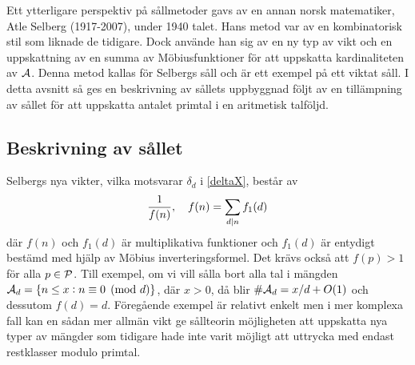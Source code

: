 Ett ytterligare perspektiv på sållmetoder gavs av en annan norsk matematiker, Atle Selberg (1917-2007), under 1940 talet. 
Hans metod var av en kombinatorisk stil som liknade de tidigare.
Dock använde han sig av en ny typ av vikt och en uppskattning av en summa av Möbiusfunktioner för att uppskatta kardinaliteten av \(\A\).
Denna metod kallas för Selbergs såll och är ett exempel på ett viktat såll. I detta avsnitt så ges en beskrivning av sållets uppbyggnad följt av en tillämpning av sållet för att uppskatta antalet primtal i en aritmetisk talföljd.

\subsection{Beskrivning av sållet}
Selbergs nya vikter, vilka motsvarar \(\delta_d\) i \eqref{deltaX}, består av
\begin{equation}
    \frac{1}{f(n)},\quad f(n) = \sum_{d\divides n}f_1(d)\nonumber
\end{equation}
där \(f(n)\) och \(f_1(d)\) är multiplikativa funktioner och \(f_1(d)\) är entydigt bestämd med hjälp av Möbius inverteringsformel. Det krävs också att \(f(p) > 1\) för alla \(p\in\P\).
Till exempel, om vi vill sålla bort alla tal i mängden \(\A_d = \{n\leq x:n \equiv 0 \pmod{d}\}\), där \(x>0\), då blir \(\#\A_d = x/d + O(1)\) och dessutom \(f(d) = d\).
Föregående exempel är relativt enkelt men i mer komplexa fall kan en sådan mer allmän vikt ge sållteorin möjligheten att uppskatta nya typer av mängder som tidigare hade inte varit möjligt att uttrycka med endast restklasser modulo primtal. 

